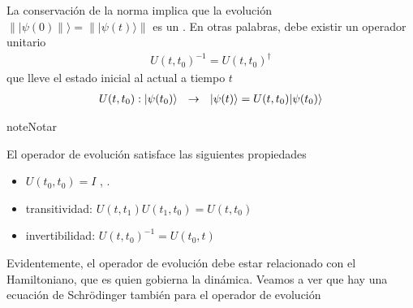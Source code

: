 \documentclass[letterpaper,10pt,english]{jupyterBook}
\newcommand{\ket}[1]{|#1\rangle}
\begin{document}
\sphinxAtStartPar
La conservación de la norma implica que la evolución \(\|\ket{\psi(0)\|} =\|\ket{\psi(t)}\|\) es un .
En otras palabras, debe existir un operador unitario
\begin{equation*}
\begin{split}
U(t,t_0)^{-1}= U(t,t_0)^\dagger 
\end{split}
\end{equation*}
\sphinxAtStartPar
que lleve el estado inicial al actual a tiempo \(t\)
\begin{equation*}
\begin{split}
 U(t,t_0): \ket{\psi(t_0)}~~ \to~~ \rule{0mm}{3.5mm} \ket{\psi(t)} = U(t,t_0)\ket{\psi(t_0)}
\end{split}
\end{equation*}
\begin{sphinxadmonition}{note}{Notar}

\sphinxAtStartPar
El operador de evolución satisface las siguientes propiedades
\begin{itemize}
\item {} 
\sphinxAtStartPar
\(U(t_0,t_0) = I\) , .

\item {} 
\sphinxAtStartPar
transitividad:  \(U(t,t_1)U(t_1,t_0)= U(t,t_0)\)

\item {} 
\sphinxAtStartPar
invertibilidad: \(U(t,t_0)^{-1} = U(t_0,t)\)

\end{itemize}
\end{sphinxadmonition}

\sphinxAtStartPar
Evidentemente, el operador de evolución debe estar relacionado con el Hamiltoniano, que es quien gobierna la dinámica. Veamos a ver que hay una ecuación de Schrödinger también para el operador de evolución
\end{document}
